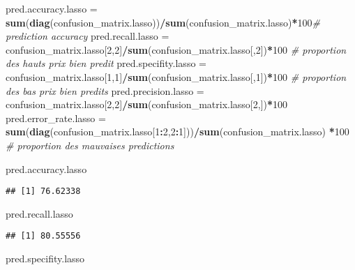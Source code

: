 \documentclass[
]{article}
\newenvironment{Shaded}{\begin{snugshade}}{\end{snugshade}}
\newcommand{\CommentTok}[1]{\textcolor[rgb]{0.56,0.35,0.01}{\textit{#1}}}
\newcommand{\DecValTok}[1]{\textcolor[rgb]{0.00,0.00,0.81}{#1}}
\newcommand{\KeywordTok}[1]{\textcolor[rgb]{0.13,0.29,0.53}{\textbf{#1}}}
\newcommand{\NormalTok}[1]{#1}
\newcommand{\OperatorTok}[1]{\textcolor[rgb]{0.81,0.36,0.00}{\textbf{#1}}}
\newcommand{\StringTok}[1]{\textcolor[rgb]{0.31,0.60,0.02}{#1}}
\begin{document}
\begin{Shaded}
\begin{Highlighting}[]
\NormalTok{pred.accuracy.lasso =}\StringTok{ }\KeywordTok{sum}\NormalTok{(}\KeywordTok{diag}\NormalTok{(confusion_matrix.lasso))}\OperatorTok{/}\KeywordTok{sum}\NormalTok{(confusion_matrix.lasso)}\OperatorTok{*}\DecValTok{100}\CommentTok{#   prediction accuracy}
\NormalTok{pred.recall.lasso =}\StringTok{ }\NormalTok{confusion_matrix.lasso[}\DecValTok{2}\NormalTok{,}\DecValTok{2}\NormalTok{]}\OperatorTok{/}\KeywordTok{sum}\NormalTok{(confusion_matrix.lasso[,}\DecValTok{2}\NormalTok{])}\OperatorTok{*}\DecValTok{100} \CommentTok{# proportion des hauts prix bien predit }
\NormalTok{pred.specifity.lasso =}\StringTok{ }\NormalTok{confusion_matrix.lasso[}\DecValTok{1}\NormalTok{,}\DecValTok{1}\NormalTok{]}\OperatorTok{/}\KeywordTok{sum}\NormalTok{(confusion_matrix.lasso[,}\DecValTok{1}\NormalTok{])}\OperatorTok{*}\DecValTok{100} \CommentTok{# proportion des bas prix bien predits}
\NormalTok{pred.precision.lasso =}\StringTok{ }\NormalTok{confusion_matrix.lasso[}\DecValTok{2}\NormalTok{,}\DecValTok{2}\NormalTok{]}\OperatorTok{/}\KeywordTok{sum}\NormalTok{(confusion_matrix.lasso[}\DecValTok{2}\NormalTok{,])}\OperatorTok{*}\DecValTok{100}
\NormalTok{pred.error_rate.lasso =}
\KeywordTok{sum}\NormalTok{(}\KeywordTok{diag}\NormalTok{(confusion_matrix.lasso[}\DecValTok{1}\OperatorTok{:}\DecValTok{2}\NormalTok{,}\DecValTok{2}\OperatorTok{:}\DecValTok{1}\NormalTok{]))}\OperatorTok{/}\KeywordTok{sum}\NormalTok{(confusion_matrix.lasso) }\OperatorTok{*}\DecValTok{100} \CommentTok{# proportion des mauvaises predictions}

\NormalTok{pred.accuracy.lasso}
\end{Highlighting}
\end{Shaded}

\begin{verbatim}
## [1] 76.62338
\end{verbatim}

\begin{Shaded}
\begin{Highlighting}[]
\NormalTok{pred.recall.lasso}
\end{Highlighting}
\end{Shaded}

\begin{verbatim}
## [1] 80.55556
\end{verbatim}

\begin{Shaded}
\begin{Highlighting}[]
\NormalTok{pred.specifity.lasso}
\end{Highlighting}
\end{Shaded}
\end{document}
